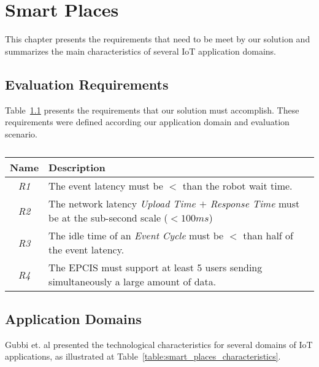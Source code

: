 
\chapter{Smart Places}
\label{appendix:smart_place}
This chapter presents the requirements that need to be meet by our solution and summarizes the main
characteristics of several \gls{IoT} application domains.

\section{Evaluation Requirements}
\label{sec:eval_requirements}
Table~\ref{table:eval_requirements} presents the requirements that our solution must accomplish.
These requirements were defined according our application domain and evaluation scenario.

\begin{table}[ht!]
  \begin{tabular}{|c|l|}
    \hline
    Name          & Description                                                                                            \\ \hline
    \textit{R1}   & The event latency must be $<$ than the robot wait time.                                               \\ \hline
    \textit{R2}   & The network latency \textit{Upload Time $+$ Response Time} must be at the sub-second scale ($< 100ms$) \\ \hline
    \textit{R3}   & The idle time of an \textit{Event Cycle} must be $<$ than half of the event latency.                  \\ \hline
    \textit{R4}   & The EPCIS must support at least 5 users sending simultaneously a large amount of data.                 \\ \hline
  \end{tabular}
  \caption{}
  \label{table:eval_requirements}
\end{table}

\section{Application Domains}
\label{sec:application_domains}

Gubbi et. al \cite{gubbi2013internet} presented the technological characteristics for several domains
of \gls{IoT} applications, as illustrated at Table~\ref{table:smart_places_characteristics}.

